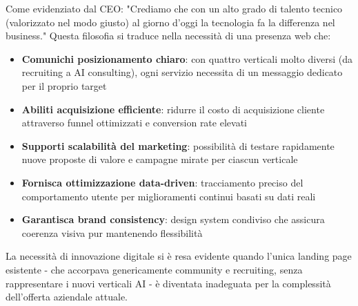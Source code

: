 Come evidenziato dal CEO: "Crediamo che con un alto grado di talento tecnico (valorizzato nel modo giusto) al giorno d'oggi la tecnologia fa la differenza nel business." Questa filosofia si traduce nella necessità di una presenza web che:

\begin{itemize}
  \item \textbf{Comunichi posizionamento chiaro}: con quattro verticali molto diversi (da recruiting a AI consulting), ogni servizio necessita di un messaggio dedicato per il proprio target
  
  \item \textbf{Abiliti acquisizione efficiente}: ridurre il costo di acquisizione cliente attraverso funnel ottimizzati e conversion rate elevati
  
  \item \textbf{Supporti scalabilità del marketing}: possibilità di testare rapidamente nuove proposte di valore e campagne mirate per ciascun verticale
  
  \item \textbf{Fornisca ottimizzazione data-driven}: tracciamento preciso del comportamento utente per miglioramenti continui basati su dati reali
  
  \item \textbf{Garantisca brand consistency}: design system condiviso che assicura coerenza visiva pur mantenendo flessibilità
\end{itemize}

La necessità di innovazione digitale si è resa evidente quando l'unica landing page esistente - che accorpava genericamente community e recruiting, senza rappresentare i nuovi verticali AI - è diventata inadeguata per la complessità dell'offerta aziendale attuale.